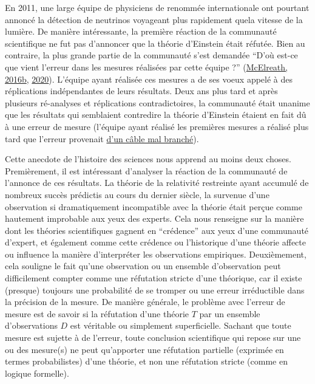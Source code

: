 \documentclass[
  a4paper,11pt,twoside,onecolumn,openright,final,oldfontcommands]{memoir}
\theoremstyle{definition}
\theoremstyle{definition}
\theoremstyle{definition}
\theoremstyle{remark}
\begin{document}
En 2011, une large équipe de physiciens de renommée internationale ont pourtant annoncé la détection de neutrinos voyageant plus rapidement quela vitesse de la lumière. De manière intéressante, la première réaction de la communauté scientifique ne fut pas d'annoncer que la théorie d'Einstein était réfutée. Bien au contraire, la plus grande partie de la communauté s'est demandée ``D'où est-ce que vient l'erreur dans les mesures réalisées par cette équipe ?'' (\protect\hyperlink{ref-mcelreath_statistical_2016}{McElreath, 2016b}, \protect\hyperlink{ref-mcelreath_statistical_2020}{2020}). L'équipe ayant réalisée ces mesures a de ses voeux appelé à des réplications indépendantes de leurs résultats. Deux ans plus tard et après plusieurs ré-analyses et réplications contradictoires, la communauté était unanime que les résultats qui semblaient contredire la théorie d'Einstein étaient en fait dû à une erreur de mesure (l'équipe ayant réalisé les premières mesures a réalisé plus tard que l'erreur provenait \href{https://profmattstrassler.com/articles-and-posts/particle-physics-basics/neutrinos/neutrinos-faster-than-light/opera-what-went-wrong/}{d'un câble mal branché}).

Cette anecdote de l'histoire des sciences nous apprend au moins deux choses. Premièrement, il est intéressant d'analyser la réaction de la communauté de l'annonce de ces résultats. La théorie de la relativité restreinte ayant accumulé de nombreux succès prédictis au cours du dernier siècle, la survenue d'une observation si dramatiquement incompatible avec la théorie était perçue comme hautement improbable aux yeux des experts. Cela nous renseigne sur la manière dont les théories scientifiques gagnent en ``crédence'' aux yeux d'une communauté d'expert, et également comme cette crédence ou l'historique d'une théorie affecte ou influence la manière d'interpréter les observations empiriques. Deuxièmement, cela souligne le fait qu'une observation ou un ensemble d'observation peut difficilement compter comme une réfutation stricte d'une théorique, car il existe (presque) toujours une probabilité de se tromper ou une erreur irréductible dans la précision de la mesure. De manière générale, le problème avec l'erreur de mesure est de savoir si la réfutation d'une théorie \(T\) par un ensemble d'observations \(D\) est véritable ou simplement superficielle. Sachant que toute mesure est sujette à de l'erreur, toute conclusion scientifique qui repose sur une ou des mesure(s) ne peut qu'apporter une réfutation partielle (exprimée en termes probabilistes) d'une théorie, et non une réfutation stricte (comme en logique formelle).
\end{document}

